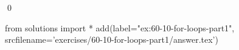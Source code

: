 
\begin{ex}
  \label{ex:60-10-for-loops-part1}
  
  \qed
\end{ex}
\begin{python0}
from solutions import *
add(label="ex:60-10-for-loops-part1",
    srcfilename='exercises/60-10-for-loops-part1/answer.tex')
\end{python0}
